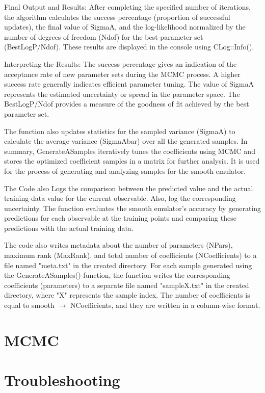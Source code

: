\documentclass[12pt]{article}
\numberwithin{equation}{section}
\numberwithin{figure}{section}
\begin{document}
Final Output and Results:
After completing the specified number of iterations, the algorithm calculates the success percentage (proportion of successful updates), the final value of SigmaA, and the log-likelihood normalized by the number of degrees of freedom (Ndof) for the best parameter set (BestLogP/Ndof). These results are displayed in the console using CLog::Info(). 

Interpreting the Results:
The success percentage gives an indication of the acceptance rate of new parameter sets during the MCMC process. A higher success rate generally indicates efficient parameter tuning. The value of SigmaA represents the estimated uncertainty or spread in the parameter space. The BestLogP/Ndof provides a measure of the goodness of fit achieved by the best parameter set. 


The function also updates statistics for the sampled variance (SigmaA) to calculate the average variance (SigmaAbar) over all the generated samples. In summary, GenerateASamples iteratively tunes the coefficients using MCMC and stores the optimized coefficient samples in a matrix for further analysis. It is used for the process of generating and analyzing samples for the smooth emulator.

The Code also Logs the comparison between the predicted value and the actual training data value for the current observable. Also, log the corresponding uncertainty. The function evaluates the smooth emulator's accuracy by generating predictions for each observable at the training points and comparing these predictions with the actual training data.  


The code also writes metadata about the number of parameters (NPars), maximum rank (MaxRank), and total number of coefficients (NCoefficients) to a file named "meta.txt" in the created directory. For each sample generated using the GenerateASamples() function, the function writes the corresponding coefficients (parameters) to a separate file named "sampleX.txt" in the created directory, where "X" represents the sample index. The number of coefficients is equal to smooth $\rightarrow$ NCoefficients, and they are written in a column-wise format. 


\section{MCMC}


\section{Troubleshooting}
\end{document}
